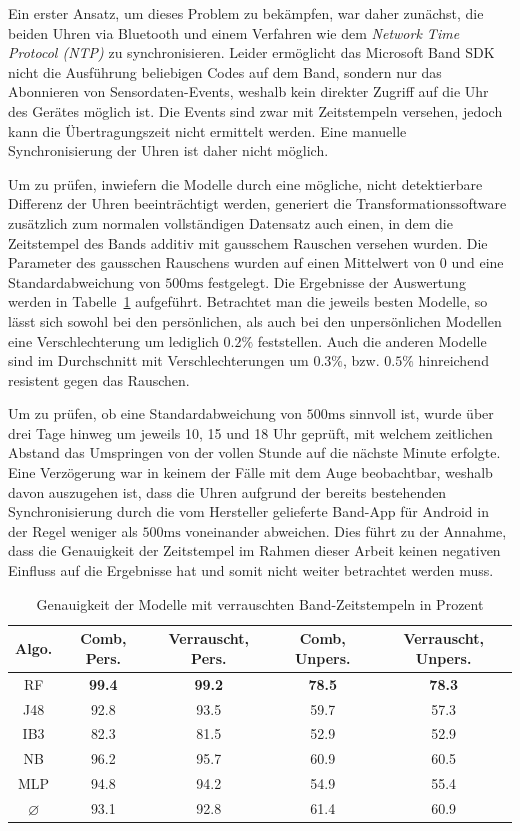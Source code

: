 Ein erster Ansatz, um dieses Problem zu bekämpfen, war daher zunächst, die beiden Uhren via Bluetooth und einem Verfahren wie dem \textit{Network Time Protocol (NTP)} \cite{Mills} zu synchronisieren. Leider ermöglicht das Microsoft Band SDK nicht die Ausführung beliebigen Codes auf dem Band, sondern nur das Abonnieren von Sensordaten-Events, weshalb kein direkter Zugriff auf die Uhr des Gerätes möglich ist. Die Events sind zwar mit Zeitstempeln versehen, jedoch kann die Übertragungszeit nicht ermittelt werden. Eine manuelle Synchronisierung der Uhren ist daher nicht möglich.

Um zu prüfen, inwiefern die Modelle durch eine mögliche, nicht detektierbare Differenz der Uhren beeinträchtigt werden, generiert die Transformationssoftware zusätzlich zum normalen vollständigen Datensatz auch einen, in dem die Zeitstempel des Bands additiv mit gausschem Rauschen versehen wurden. Die Parameter des gausschen Rauschens wurden auf einen Mittelwert von $0$ und eine Standardabweichung von $500 \text{ms}$ festgelegt. Die Ergebnisse der Auswertung werden in Tabelle~\ref{tab:accuracy-noisy_timestamps} aufgeführt. Betrachtet man die jeweils besten Modelle, so lässt sich sowohl bei den persönlichen, als auch bei den unpersönlichen Modellen eine Verschlechterung um lediglich $0.2 \%$ feststellen. Auch die anderen Modelle sind im Durchschnitt mit Verschlechterungen um $0.3 \%$, bzw. $0.5 \%$ hinreichend resistent gegen das Rauschen.

Um zu prüfen, ob eine Standardabweichung von $500 \text{ms}$ sinnvoll ist, wurde über drei Tage hinweg um jeweils 10, 15 und 18 Uhr geprüft, mit welchem zeitlichen Abstand das Umspringen von der vollen Stunde auf die nächste Minute erfolgte. Eine Verzögerung war in keinem der Fälle mit dem Auge beobachtbar, weshalb davon auszugehen ist, dass die Uhren aufgrund der bereits bestehenden Synchronisierung durch die vom Hersteller gelieferte Band-App für Android in der Regel weniger als $500 \text{ms}$ voneinander abweichen. Dies führt zu der Annahme, dass die Genauigkeit der Zeitstempel im Rahmen dieser Arbeit keinen negativen Einfluss auf die Ergebnisse hat und somit nicht weiter betrachtet werden muss.

\begin{table}
\centering
\begin{tabular}{|c|c|c||c|c|}
	\hline 
	\textbf{Algo.} & \textbf{Comb, Pers.} & \textbf{Verrauscht, Pers.} &\textbf{Comb, Unpers.} & \textbf{Verrauscht, Unpers.} \\ 
	\hline 
	RF & \textbf{99.4} & \textbf{99.2} & \textbf{78.5} & \textbf{78.3} \\ 
	J48 & 92.8 & 93.5 & 59.7 & 57.3 \\ 
	IB3 & 82.3 & 81.5 & 52.9 & 52.9 \\ 
	NB & 96.2 & 95.7 & 60.9 & 60.5 \\ 
	MLP & 94.8 & 94.2 & 54.9 & 55.4 \\ 
	\hline 
	$\varnothing$ & 93.1 & 92.8 & 61.4 & 60.9 \\ 
	\hline
\end{tabular} 
\caption{Genauigkeit der Modelle mit verrauschten Band-Zeitstempeln in Prozent}
\label{tab:accuracy-noisy_timestamps}
\end{table}

